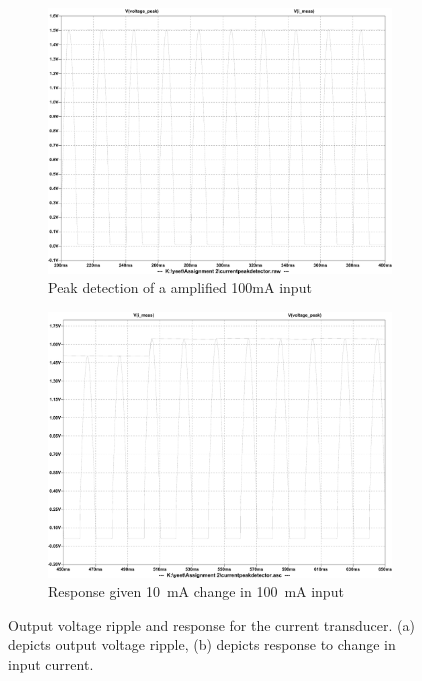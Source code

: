 \begin{figure}[h!]
 \centering
     \begin{subfigure}[]{0.45\textwidth}
        \centering
         \includegraphics[width=1\linewidth]{./Figures/currentpeakdetectoroutputsim.pdf}
		    \caption{Peak detection of a amplified 100mA input} \label{subfig:currenttransducer100maripple}
     \end{subfigure}
      \begin{subfigure}[]{0.45\textwidth}
              \centering
  		\includegraphics[width=1\linewidth]{./Figures/currentpeakdetectoroutputchange.pdf}
		    \caption{Response given \SI{10}{mA} change in \SI{100}{mA} input} \label{subfig:currenttransducerinputchange}
     \end{subfigure}
   \caption[Simulated results for the current transducer]{Output voltage ripple and response for the current transducer. (a) depicts output voltage ripple, (b) depicts response to change in input current. }
    \label{fig:simulation_results_box}
 \end{figure}


